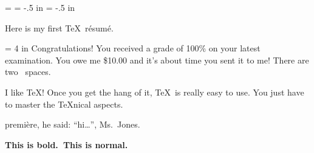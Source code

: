 \nopagenumbers{}
\magnification = 
\hoffset = -.5 in
\voffset = -.5 in
\par Here is my first \TeX\ r\'esum\'e.
\par \hsize = 4 in Congratulations! You received a grade of 100\% on your latest
examination. You owe me \$10.00 and it’s about time you sent it to me! There
are two \ spaces.
\par I like \TeX{}! Once you get the hang of it, \TeX\ is really easy to use. You just
have to master the \TeX{}nical aspects.
\par premi\`ere, he said: ``hi\dots'', Ms.~Jones.
\par \bf This is bold.\rm\  This is normal.
\bye{}

